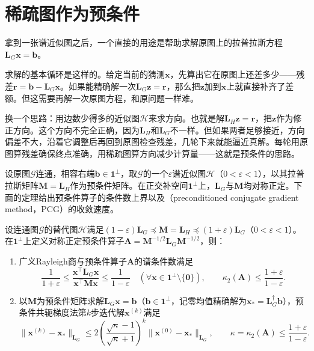 \section{稀疏图作为预条件}
\label{sec:graph-sparse-preconditioning}

拿到一张谱近似图之后，一个直接的用途是帮助求解原图上的拉普拉斯方程$\bm L_G\bm x=\bm b$。

求解的基本循环是这样的。给定当前的猜测$\bm x$，先算出它在原图上还差多少——残差$\bm r=\bm b-\bm L_G\bm x$。如果能精确解一次$\bm L_G\bm z=\bm r$，那么把$\bm z$加到$\bm x$上就直接补齐了差额。但这需要再解一次原图方程，和原问题一样难。

换一个思路：用边数少得多的近似图$\mathcal H$来求方向。也就是解$\bm L_H\bm z=\bm r$，把$\bm z$作为修正方向。这个方向不完全正确，因为$\bm L_H$和$\bm L_G$不一样。但如果两者足够接近，方向偏差不大，沿着它调整后再回到原图检查残差，几轮下来就能逼近真解。每轮用原图算残差确保终点准确，用稀疏图算方向减少计算量——这就是预条件的思路。

设原图$\mathcal G$连通，相容右端$\bm b\in\bm 1^\perp$，取$\mathcal G$的一个$\varepsilon$谱近似图$\mathcal H$（$0<\varepsilon<1$），以其拉普拉斯矩阵$\bm M=\bm L_H$作为预条件矩阵。在正交补空间$\bm 1^\perp$上，$\bm L_G$与$\bm M$均对称正定。下面的定理给出预条件算子的条件数上界以及（preconditioned conjugate gradient method，PCG）的收敛速度。

\begin{theorem}[谱近似预条件的条件数与收敛界]
\label{prop:graph-sparse-preconditioner}
设连通图$\mathcal G$的替代图$\mathcal H$满足$(1-\varepsilon)\bm L_G\preceq\bm M=\bm L_H\preceq(1+\varepsilon)\bm L_G$（$0<\varepsilon<1$）。在$\bm 1^\perp$上定义对称正定预条件算子$\bm A=\bm M^{-1/2}\bm L_G\bm M^{-1/2}$，则：
\begin{enumerate}
  \item 广义Rayleigh商与预条件算子$\bm A$的谱条件数满足
  \begin{equation}
  \frac{1}{1+\varepsilon}
  \leq
  \frac{\bm x^\top\bm L_G\bm x}{\bm x^\top\bm M\bm x}
  \leq
  \frac{1}{1-\varepsilon}\quad(\forall\bm x\in\bm 1^\perp\setminus\{\bm 0\}),
  \qquad
  \kappa_2(\bm A)\leq\frac{1+\varepsilon}{1-\varepsilon}.
  \label{eq:graph-sparse-preconditioned-condition}
  \end{equation}
  \item 以$\bm M$为预条件矩阵求解$\bm L_G\bm x=\bm b$（$\bm b\in\bm 1^\perp$，记零均值精确解为$\bm x_*=\bm L_G^\dagger\bm b$），预条件共轭梯度法第$k$步迭代解$\bm x^{(k)}$满足
  \begin{equation}
  \lVert\bm x^{(k)}-\bm x_*\rVert_{\bm L_G}
  \leq
  2\left(\frac{\sqrt\kappa-1}{\sqrt\kappa+1}\right)^k
  \lVert\bm x^{(0)}-\bm x_*\rVert_{\bm L_G},
  \qquad \kappa=\kappa_2(\bm A)\leq\frac{1+\varepsilon}{1-\varepsilon}.
  \label{eq:graph-sparse-preconditioned-cg-error}
  \end{equation}
\end{enumerate}
\end{theorem}

